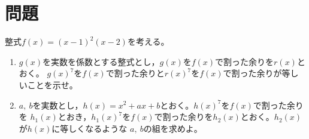 \documentclass[../../../doc/main]{subfiles}
\begin{document}
    \setcounter{chapter}{5}
    \setcounter{section}{1}
    \section{問題}\label{問題5}
        \begin{tcolorbox}
            整式$f(x)=(x-1)^2(x-2)$を考える。
            \begin{enumerate}
                \item [\kakkoichi] $g(x)$を実数を係数とする整式とし，$g(x)$を$f(x)$で割った余りを$r(x)$とおく。
                $g(x)^7$を$f(x)$で割った余りと$r(x)^7$を$f(x)$で割った余りが等しいことを示せ。
                \item [\kakkoni] $a,~b$を実数とし，$h(x)=x^2+ax+b$とおく。$h(x)^7$を$f(x)$で割った余りを
                $h_1(x)$とおき，$h_1(x)^7$を$f(x)$で割った余りを$h_2(x)$とおく。$h_2(x)$が$h(x)$に等しくなるような
                $a,~b$の組を求めよ。
            \end{enumerate}
        \end{tcolorbox}
\end{document}
